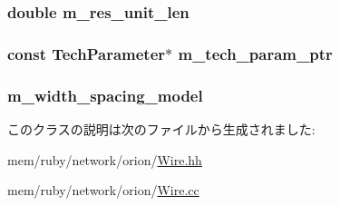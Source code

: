 \label{classWire_a30a69ab7be11cb270516c7513c71a082}
\hypertarget{classWire_aaafce977b96802f23fd6822c743fe6a9}{
\subsubsection[{m\_\-res\_\-unit\_\-len}]{\setlength{\rightskip}{0pt plus 5cm}double {\bf m\_\-res\_\-unit\_\-len}}}
\label{classWire_aaafce977b96802f23fd6822c743fe6a9}
\hypertarget{classWire_a11d1644aa2bfe0e16783dface6fadf13}{
\subsubsection[{m\_\-tech\_\-param\_\-ptr}]{\setlength{\rightskip}{0pt plus 5cm}const {\bf TechParameter}$\ast$ {\bf m\_\-tech\_\-param\_\-ptr}}}
\label{classWire_a11d1644aa2bfe0e16783dface6fadf13}
\hypertarget{classWire_a337b5fb47933bd32d61be3f7687bee78}{
\subsubsection[{m\_\-width\_\-spacing\_\-model}]{ {\bf m\_\-width\_\-spacing\_\-model}}}
\label{classWire_a337b5fb47933bd32d61be3f7687bee78}


このクラスの説明は次のファイルから生成されました:\begin{DoxyCompactItemize}
\item 
mem/ruby/network/orion/\hyperlink{Wire_8hh}{Wire.hh}\item 
mem/ruby/network/orion/\hyperlink{Wire_8cc}{Wire.cc}\end{DoxyCompactItemize}
